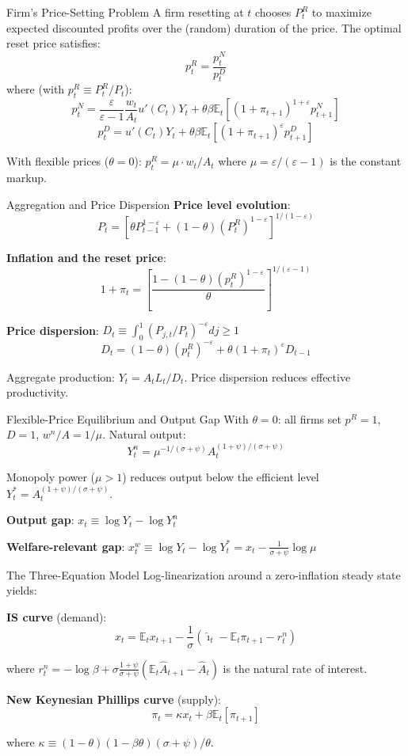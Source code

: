 \documentclass[blue]{beamer}
\newcommand{\E}{\mathbb{E}}
\begin{document}
\begin{frame}{Firm's Price-Setting Problem}
A firm resetting at $t$ chooses $P_t^R$ to maximize expected discounted profits over the (random) duration of the price. The optimal reset price satisfies:
\[
p_t^R = \frac{p_t^N}{p_t^D}
\]
where (with $p_t^R \equiv P_t^R/P_t$):
\[
p_t^N = \frac{\varepsilon}{\varepsilon-1} \frac{w_t}{A_t} u'(C_t) Y_t + \theta \beta \E_t[(1+\pi_{t+1})^{1+\varepsilon} p_{t+1}^N]
\]
\[
p_t^D = u'(C_t) Y_t + \theta \beta \E_t[(1+\pi_{t+1})^{\varepsilon} p_{t+1}^D]
\]

With flexible prices ($\theta = 0$): $p_t^R = \mu \cdot w_t/A_t$ where $\mu = \varepsilon/(\varepsilon-1)$ is the constant markup.
\end{frame}

\begin{frame}{Aggregation and Price Dispersion}
\textbf{Price level evolution}:
\[
P_t = \left[\theta P_{t-1}^{1-\varepsilon} + (1-\theta)(P_t^R)^{1-\varepsilon}\right]^{1/(1-\varepsilon)}
\]

\textbf{Inflation and the reset price}:
\[
1 + \pi_t = \left[\frac{1-(1-\theta)(p_t^R)^{1-\varepsilon}}{\theta}\right]^{1/(\varepsilon-1)}
\]

\textbf{Price dispersion}: $D_t \equiv \int_0^1 (P_{j,t}/P_t)^{-\varepsilon} dj \geq 1$
\[
D_t = (1-\theta)(p_t^R)^{-\varepsilon} + \theta(1+\pi_t)^{\varepsilon} D_{t-1}
\]

Aggregate production: $Y_t = A_t L_t / D_t$. Price dispersion reduces effective productivity.
\end{frame}

\begin{frame}{Flexible-Price Equilibrium and Output Gap}
With $\theta = 0$: all firms set $p^R = 1$, $D = 1$, $w^n/A = 1/\mu$. Natural output:
\[
Y_t^n = \mu^{-1/(\sigma+\psi)} A_t^{(1+\psi)/(\sigma+\psi)}
\]

Monopoly power ($\mu > 1$) reduces output below the efficient level $Y_t^* = A_t^{(1+\psi)/(\sigma+\psi)}$.

\bigskip
\textbf{Output gap}: $x_t \equiv \log Y_t - \log Y_t^n$

\textbf{Welfare-relevant gap}: $x_t^w \equiv \log Y_t - \log Y_t^* = x_t - \frac{1}{\sigma+\psi}\log\mu$
\end{frame}

\begin{frame}{The Three-Equation Model}
Log-linearization around a zero-inflation steady state yields:

\bigskip
\textbf{IS curve} (demand):
\[
x_t = \E_t x_{t+1} - \frac{1}{\sigma}(\hat{\imath}_t - \E_t \pi_{t+1} - r_t^n)
\]

where $r_t^n = -\log\beta + \sigma\frac{1+\psi}{\sigma+\psi}(\E_t \hat{A}_{t+1} - \hat{A}_t)$ is the natural rate of interest.

\bigskip
\textbf{New Keynesian Phillips curve} (supply):
\[
\pi_t = \kappa x_t + \beta \E_t[\pi_{t+1}]
\]

where $\kappa \equiv (1-\theta)(1-\beta\theta)(\sigma+\psi)/\theta$.

\bigskip
\end{frame}
\end{document}
